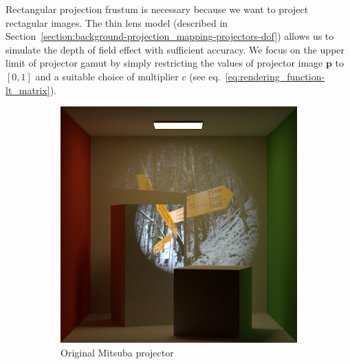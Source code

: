 Rectangular projection frustum is necessary because we want to project rectagular images. The thin lens model (described in Section~\ref{section:background-projection_mapping-projectors-dof}) allows us to simulate the depth of field effect with sufficient accuracy. We focus on the upper limit of projector gamut by simply restricting the values of projector image \(\bm{p}\) to \([0, 1]\) and a suitable choice of multiplier \(c\) (see eq.~\ref{eq:rendering_function-lt_matrix}).

\begin{figure}[]
    \centering
    \begin{subfigure}[b]{0.32\textwidth}
        \centering
        \includegraphics[width=\textwidth]{images/03-projector_features-spotlight.jpg}
        \caption{Original Mitsuba projector}
        \label{fig:methods_projector_features_spotlight}
    \end{subfigure}
    \hfill
    \begin{subfigure}[b]{0.32\textwidth}
        \centering

\end{subfigure}
\end{figure}
